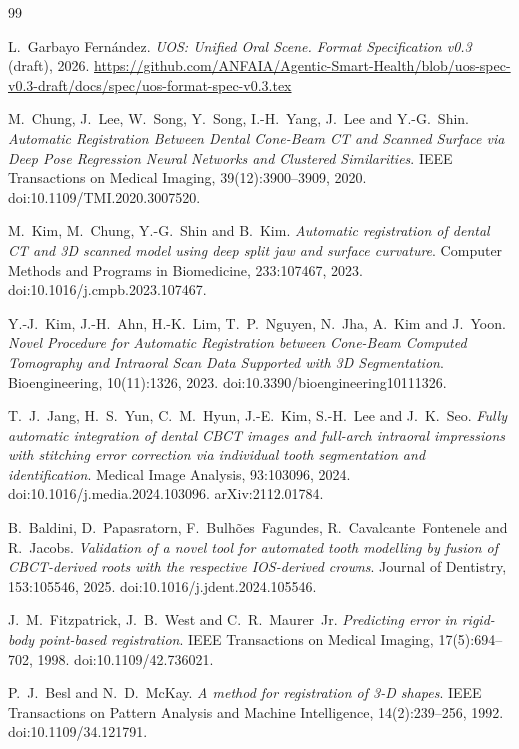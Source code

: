 \documentclass[11pt,a4paper]{article}
\begin{document}
\begin{thebibliography}{99}

L.~Garbayo Fernández.
\emph{UOS: Unified Oral Scene. Format Specification v0.3} (draft), 2026.
\url{https://github.com/ANFAIA/Agentic-Smart-Health/blob/uos-spec-v0.3-draft/docs/spec/uos-format-spec-v0.3.tex}

M.~Chung, J.~Lee, W.~Song, Y.~Song, I.-H.~Yang, J.~Lee and Y.-G.~Shin.
\emph{Automatic Registration Between Dental Cone-Beam CT and Scanned Surface via Deep Pose
Regression Neural Networks and Clustered Similarities}.
IEEE Transactions on Medical Imaging, 39(12):3900--3909, 2020. doi:10.1109/TMI.2020.3007520.

M.~Kim, M.~Chung, Y.-G.~Shin and B.~Kim.
\emph{Automatic registration of dental CT and 3D scanned model using deep split jaw and
surface curvature}.
Computer Methods and Programs in Biomedicine, 233:107467, 2023.
doi:10.1016/j.cmpb.2023.107467.

Y.-J.~Kim, J.-H.~Ahn, H.-K.~Lim, T.~P.~Nguyen, N.~Jha, A.~Kim and J.~Yoon.
\emph{Novel Procedure for Automatic Registration between Cone-Beam Computed Tomography and
Intraoral Scan Data Supported with 3D Segmentation}.
Bioengineering, 10(11):1326, 2023. doi:10.3390/bioengineering10111326.

T.~J.~Jang, H.~S.~Yun, C.~M.~Hyun, J.-E.~Kim, S.-H.~Lee and J.~K.~Seo.
\emph{Fully automatic integration of dental CBCT images and full-arch intraoral impressions
with stitching error correction via individual tooth segmentation and identification}.
Medical Image Analysis, 93:103096, 2024. doi:10.1016/j.media.2024.103096.
arXiv:2112.01784.

B.~Baldini, D.~Papasratorn, F.~Bulh{\~o}es~Fagundes, R.~Cavalcante~Fontenele and R.~Jacobs.
\emph{Validation of a novel tool for automated tooth modelling by fusion of CBCT-derived
roots with the respective IOS-derived crowns}.
Journal of Dentistry, 153:105546, 2025. doi:10.1016/j.jdent.2024.105546.

J.~M.~Fitzpatrick, J.~B.~West and C.~R.~Maurer~Jr.
\emph{Predicting error in rigid-body point-based registration}.
IEEE Transactions on Medical Imaging, 17(5):694--702, 1998. doi:10.1109/42.736021.

P.~J.~Besl and N.~D.~McKay.
\emph{A method for registration of 3-D shapes}.
IEEE Transactions on Pattern Analysis and Machine Intelligence, 14(2):239--256, 1992.
doi:10.1109/34.121791.


\end{thebibliography}
\end{document}

